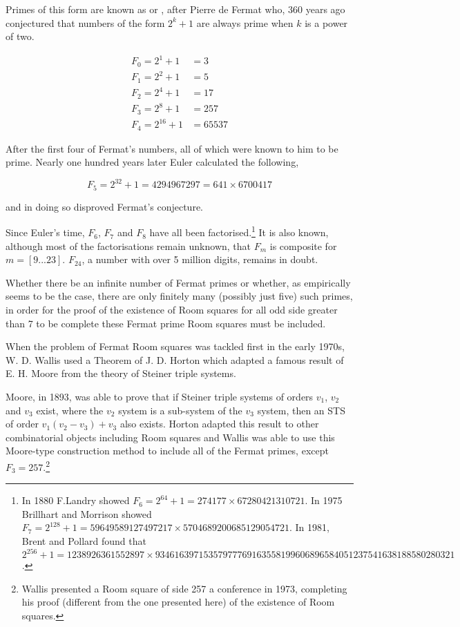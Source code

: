 Primes of this form are known as  or , after Pierre de Fermat who, 360 years ago conjectured that numbers of the form $2^k + 1$ are always prime when $k$ is a power of two.

\begin{align*}
  F_0 = 2^1 + 1 &= 3 \\
  F_1 = 2^2 + 1 &= 5 \\
  F_2 = 2^4 + 1 &= 17 \\
  F_3 = 2^8 + 1 &= 257 \\
  F_4 = 2^{16} + 1 &= 65537
\end{align*}

After the first four of Fermat’s numbers, all of which were known to him to be prime.
Nearly one hundred years later Euler calculated the following,

\begin{equation}
F_5 = 2^{32}+1 = 4294967297 = 641\times 6700417
\end{equation}

and in doing so disproved Fermat’s conjecture.

Since Euler’s time, $F_6$, $F_7$ and $F_8$ have all been factorised.\footnote{In 1880 F.Landry showed $F_6=2^{64}+1=274177 \times 67280421310721$.
In 1975 Brillhart and Morrison showed $F_7=2^{128}+1=59649589127497217 \times 5704689200685129054721$.
In 1981, Brent and Pollard found that $2^{256}+1=1238926361552897 \times 93461639715357977769163558199606896584051237541638188580280321$.}
It is also known, although most of the factorisations remain unknown, that $F_m$ is composite for $m = [9...23]$.
$F_{24}$, a number with over 5 million digits, remains in doubt.

Whether there be an infinite number of Fermat primes or whether, as empirically seems to be the case, there are only finitely many (possibly just five) such primes, in order for the proof of the existence of Room squares for all odd side greater than 7 to be complete these Fermat prime Room squares must be included.

When the problem of Fermat Room squares was tackled first in the early 1970s, W. D. Wallis used a Theorem of J. D. Horton which adapted a famous result of E. H. Moore from the theory of Steiner triple systems.

Moore, in 1893, was able to prove that if Steiner triple systems of orders $v_1$, $v_2$ and $v_3$ exist, where the $v_2$ system is a sub-system of the $v_3$ system, then an STS of order $v_1(v_2 - v_3) + v_3$ also exists.
Horton
\cite{hortonVariationsThemeMoore1970}
adapted this result to other combinatorial objects including Room squares and Wallis
\cite{wallisCombinatoricsRoomSquares2006}
was able to use this Moore-type construction method to include all of the Fermat primes, except $F_3 = 257$.\footnote{Wallis presented a Room square of side 257 a conference in 1973, completing his proof (different from the one presented here) of the existence of Room squares.}

